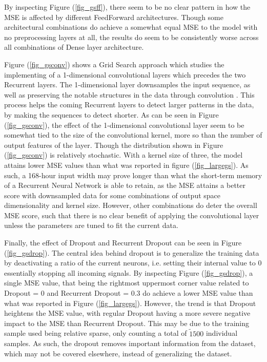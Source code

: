 \documentclass
[twocolumn,
secnumarabic,
nobibnotes,
aps,
prl,
reprint,
groupedaddress,
amsmath,
amssymb,
]{revtex4-2}
\begin{document}
By inspecting Figure (\ref{fig_gsff}), there seem to be no clear pattern in how the MSE is affected by different FeedForward architectures. Though some architectural combinations do achieve a somewhat equal MSE to the model with no preprocessing layers at all, the results do seem to be consistently worse across all combinations of Dense layer architecture.  

Figure (\ref{fig_gsconv}) shows a Grid Search approach which studies the implementing of a 1-dimensional convolutional layers which precedes the two Recurrent layers. The 1-dimensional layer downsamples the input sequence, as well as preserving the notable structures in the data through convolution \cite{Geron2019}. This process helps the coming Recurrent layers to detect larger patterns in the data, by making the sequences to detect shorter. As can be seen in Figure (\ref{fig_gsconv}), the effect of the 1-dimensional convolutional layer seem to be somewhat tied to the size of the convolutional kernel, more so than the number of output features of the layer. Though the distribution shown in Figure (\ref{fig_gsconv}) is relatively stochastic. With a kernel size of three, the model attains lower MSE values than what was reported in figure (\ref{fig_largegs}). As such, a 168-hour input width may prove longer than what the short-term memory of a Recurrent Neural Network is able to retain, as the MSE attains a better score with downsampled data for some combinations of output space dimensionality and kernel size. However, other combinations do deter the overall MSE score, such that there is no clear benefit of applying the convolutional layer unless the parameters are tuned to fit the current data.

Finally, the effect of Dropout and Recurrent Dropout can be seen in Figure (\ref{fig_gsdrop}). The central idea behind dropout is to generalize the training data by deactivating a ratio of the current neurons, i.e. setting their internal value to 0 essentially stopping all incoming signals. By inspecting Figure (\ref{fig_gsdrop}), a single MSE value, that being the rightmost uppermost corner value related to Dropout = 0 and Recurrent Dropout = 0.3 do achieve a lower MSE value than what was reported in Figure (\ref{fig_largegs}). However, the trend is that Dropout heightens the MSE value, with regular Dropout having a more severe negative impact to the MSE than Recurrent Dropout. This may be due to the training sample used being relative sparse, only counting a total of $\tilde1500$ individual samples. As such, the dropout removes important information from the dataset, which may not be covered elsewhere, instead of generalizing the dataset. 
\end{document}
